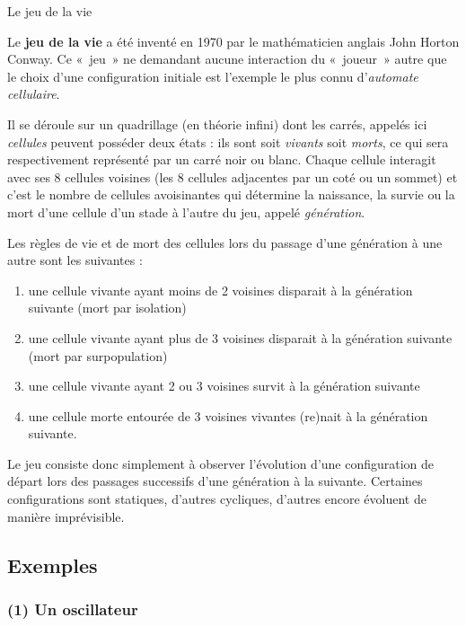 \begin{Exercice}{Le jeu de la vie}

	Le \textbf{jeu de la vie} a été inventé en 1970 
	par le mathématicien anglais John Horton Conway. 
	Ce «~jeu~» ne demandant aucune interaction du «~joueur~» 
	autre que le choix d’une configuration initiale 
	est l’exemple le plus connu d’\textit{automate cellulaire}.

	Il se déroule sur un quadrillage 
	(en théorie infini) dont les carrés, 
	appelés ici \textit{cellules}
	peuvent posséder deux états : 
	ils sont soit \textit{vivants} soit \textit{morts}, 
	ce qui sera respectivement représenté par un carré noir ou blanc. 
	Chaque cellule interagit avec ses 8 cellules voisines 
	(les 8 cellules adjacentes par un coté ou un sommet) 
	et c’est le nombre de cellules avoisinantes qui détermine la naissance, 
	la survie ou la mort d’une cellule d’un stade à l’autre du jeu, 
	appelé \textit{génération}.

	Les règles de vie et de mort des cellules lors du passage d’une
	génération à une autre sont les suivantes :

	\begin{enumerate}
	\item 
		une cellule vivante ayant moins de 2 voisines disparait à la
		génération suivante (mort par isolation)
	\item 
		une cellule vivante ayant plus de 3 voisines disparait à la génération
		suivante (mort par surpopulation)
	\item
		une cellule vivante ayant 2 ou 3 voisines survit à la génération
		suivante
	\item
		une cellule morte entourée de 3 voisines vivantes (re)nait à la
		génération suivante.
	\end{enumerate}

	Le jeu consiste donc simplement à observer l’évolution d’une
	configuration de départ lors des passages successifs d’une génération à
	la suivante. Certaines configurations sont statiques, d’autres
	cycliques, d’autres encore évoluent de manière imprévisible.

	\subsection*{Exemples}

	\subsubsection*{(1) Un oscillateur}


\end{Exercice}
